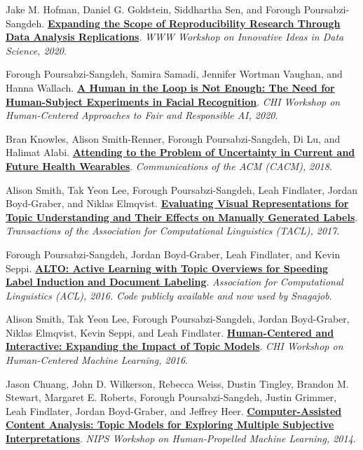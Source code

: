 \documentclass[11pt,letterpaper]{article}
\newcommand{\publication}[3]{%
  \Needspace{5\baselineskip}%
  \begingroup
  \setlength{\parindent}{0pt}%
  \setlength{\hangindent}{1.1em}%
  \setlength{\hangafter}{1}%
  #1. \textbf{#2}. \emph{#3}.\par
  \endgroup
  \vspace{0.7em}%
}
\begin{document}
\publication{Jake M. Hofman, Daniel G. Goldstein, Siddhartha Sen, and Forough Poursabzi-Sangdeh}
{\href{http://hyadatalab.com/IID2020/papers/IID_2020_paper_5.pdf}{Expanding the Scope of Reproducibility Research Through Data Analysis Replications}}
{WWW Workshop on Innovative Ideas in Data Science, 2020}

\publication{Forough Poursabzi-Sangdeh, Samira Samadi, Jennifer Wortman Vaughan, and Hanna Wallach}
{\href{https://foroughp.github.io/uploads/chi20-fr.pdf}{A Human in the Loop is Not Enough: The Need for Human-Subject Experiments in Facial Recognition}}
{CHI Workshop on Human-Centered Approaches to Fair and Responsible AI, 2020}

\publication{Bran Knowles, Alison Smith-Renner, Forough Poursabzi-Sangdeh, Di Lu, and Halimat Alabi}
{\href{http://eprints.lancs.ac.uk/124041/1/Knowles_2018_CACM_Uncertainty.pdf}{Attending to the Problem of Uncertainty in Current and Future Health Wearables}}
{Communications of the ACM (CACM), 2018}

\publication{Alison Smith, Tak Yeon Lee, Forough Poursabzi-Sangdeh, Leah Findlater, Jordan Boyd-Graber, and Niklas Elmqvist}
{\href{http://www.aclweb.org/anthology/Q17-1001}{Evaluating Visual Representations for Topic Understanding and Their Effects on Manually Generated Labels}}
{Transactions of the Association for Computational Linguistics (TACL), 2017}

\publication{Forough Poursabzi-Sangdeh, Jordan Boyd-Graber, Leah Findlater, and Kevin Seppi}
{\href{http://www.aclweb.org/anthology/P16-1110}{ALTO: Active Learning with Topic Overviews for Speeding Label Induction and Document Labeling}}
{Association for Computational Linguistics (ACL), 2016. Code publicly available and now used by Snagajob}

\publication{Alison Smith, Tak Yeon Lee, Forough Poursabzi-Sangdeh, Jordan Boyd-Graber, Niklas Elmqvist, Kevin Seppi, and Leah Findlater}
{\href{http://www.doc.gold.ac.uk/~mas02mg/HCML2016/HCML2016_paper_18.pdf}{Human-Centered and Interactive: Expanding the Impact of Topic Models}}
{CHI Workshop on Human-Centered Machine Learning, 2016}

\publication{Jason Chuang, John D. Wilkerson, Rebecca Weiss, Dustin Tingley, Brandon M. Stewart, Margaret E. Roberts, Forough Poursabzi-Sangdeh, Justin Grimmer, Leah Findlater, Jordan Boyd-Graber, and Jeffrey Heer}
{\href{https://scholar.princeton.edu/sites/default/files/bstewart/files/nipshpml2014.pdf}{Computer-Assisted Content Analysis: Topic Models for Exploring Multiple Subjective Interpretations}}
{NIPS Workshop on Human-Propelled Machine Learning, 2014}
\end{document}
